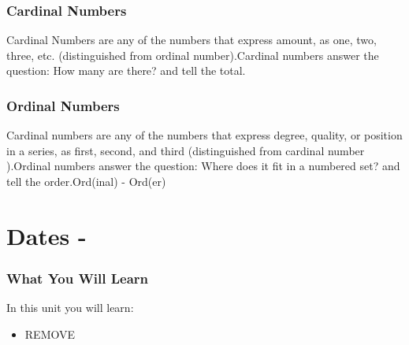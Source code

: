 \subsection{Cardinal Numbers}
Cardinal Numbers are any of the numbers that express amount, as one, two, three,  etc. (distinguished from ordinal number).\cite{cardinalNumbers}Cardinal numbers answer the question: How many are there? and tell the total.\subsection{Ordinal Numbers}
Cardinal numbers are any of the numbers that express degree, quality, or position in a series, as first, second, and third  (distinguished from cardinal number ).\cite{ordinalNumbers}Ordinal numbers answer the question: Where does it fit in a numbered set? and tell the order.Ord(inal) - Ord(er)
\index{}
\chapter{Dates - }
\subsection{What You Will Learn}
In this unit you will learn:
\begin{itemize}
\item REMOVE
\end{itemize}\newpage

